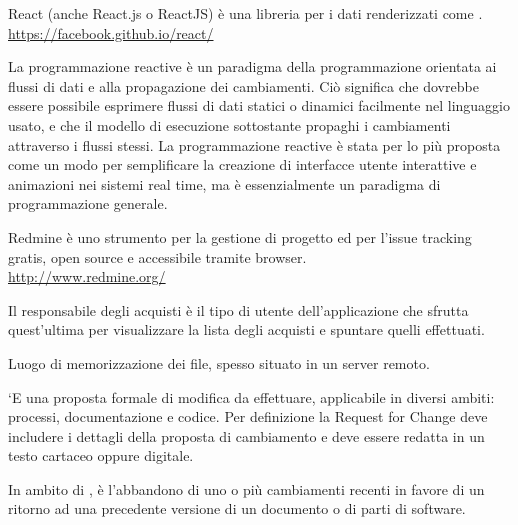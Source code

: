 React (anche React.js o ReactJS) è una libreria   per i dati renderizzati come .\\
\url{https://facebook.github.io/react/}

La programmazione reactive è un paradigma della programmazione orientata ai flussi di dati e alla propagazione dei cambiamenti. Ciò significa che dovrebbe essere possibile esprimere flussi di dati statici o dinamici facilmente nel linguaggio usato, e che il modello di esecuzione sottostante propaghi i cambiamenti attraverso i flussi stessi. La programmazione reactive è stata per lo più proposta come un modo per semplificare la creazione di interfacce utente interattive e animazioni nei sistemi real time, ma è essenzialmente un paradigma di programmazione generale.

Redmine è uno strumento per la gestione di progetto ed per l’issue tracking gratis, open source e accessibile tramite browser.\\ 
\url{http://www.redmine.org/}

Il responsabile degli acquisti è il tipo di utente dell’applicazione che sfrutta quest’ultima per visualizzare la lista degli acquisti e spuntare quelli effettuati.

Luogo di memorizzazione dei file, spesso situato in un server remoto.

`{E} una proposta formale di modifica da effettuare, applicabile in diversi ambiti: processi, documentazione e codice. Per definizione la Request for Change deve includere i dettagli della proposta di cambiamento e deve essere redatta in un testo cartaceo oppure digitale. 

In ambito di , è l'abbandono di uno o più cambiamenti recenti in favore di un ritorno ad una precedente versione di un documento o di parti di software.
\clearpage
